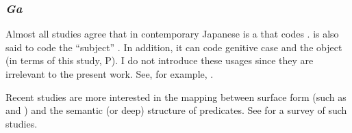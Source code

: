 \subsubsection{\textit{Ga}}

Almost all studies agree that
 in contemporary Japanese is a  that codes  \cite[e.g.,][]{yamada36,kuno73,tanaka77,shibatani90}.
 is also said to code the ``subject'' \cite[e.g.,][164]{kuroda79}.
In addition,
it can code genitive case and the object (in terms of this study, P).
I do not introduce these usages since they are irrelevant to the present work.
See, for example, .

Recent studies are more interested in the mapping between
surface form (such as  and )
and the semantic (or deep) structure of predicates.
See  for a survey of such studies.


